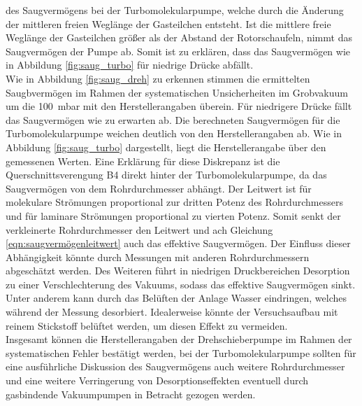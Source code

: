des Saugvermögens bei der Turbomolekularpumpe, welche durch die Änderung der mittleren freien
Weglänge der Gasteilchen entsteht. Ist die mittlere freie Weglänge der Gasteilchen
größer als der Abstand der Rotorschaufeln, nimmt das Saugvermögen der Pumpe ab. Somit ist zu 
erklären, dass das Saugvermögen wie in Abbildung \ref{fig:saug_turbo} für niedrige Drücke 
abfällt.
\\
Wie in Abbildung \ref{fig:saug_dreh} zu erkennen stimmen die ermittelten Saugbvermögen im Rahmen 
der systematischen Unsicherheiten im Grobvakuum um die \SI{100}{\milli\bar} mit den Herstellerangaben 
überein. Für niedrigere Drücke fällt das Saugvermögen wie zu erwarten ab. 
Die berechneten Saugvermögen für die Turbomolekularpumpe weichen deutlich von den Herstellerangaben
ab. Wie in Abbildung \ref{fig:saug_turbo} dargestellt, liegt die Herstellerangabe über den gemessenen Werten.
Eine Erklärung für diese Diskrepanz ist die Querschnittsverengung B4 direkt hinter der Turbomolekularpumpe,
da das Saugvermögen von dem Rohrdurchmesser abhängt.
Der Leitwert ist für molekulare Strömungen proportional zur dritten Potenz des Rohrdurchmessers und für 
laminare Strömungen proportional zu vierten Potenz. 
Somit senkt der verkleinerte Rohrdurchmesser den Leitwert und ach Gleichung \ref{eqn:saugvermögenleitwert} 
auch das effektive Saugvermögen. Der Einfluss dieser Abhängigkeit könnte 
durch Messungen mit anderen Rohrdurchmessern abgeschätzt werden. 
Des Weiteren führt in niedrigen Druckbereichen Desorption zu einer Verschlechterung des Vakuums, sodass
das effektive Saugvermögen sinkt. Unter anderem kann durch das Belüften der Anlage Wasser eindringen, 
welches während der Messung desorbiert. Idealerweise könnte der Versuchsaufbau mit reinem Stickstoff 
belüftet werden, um diesen Effekt zu vermeiden.
\\
Insgesamt können die Herstellerangaben der Drehschieberpumpe im Rahmen der systematischen Fehler 
bestätigt werden, bei der Turbomolekularpumpe sollten für eine ausführliche Diskussion des 
Saugvermögens auch weitere Rohrdurchmesser und eine weitere Verringerung von Desorptionseffekten 
eventuell durch gasbindende Vakuumpumpen in Betracht gezogen werden.